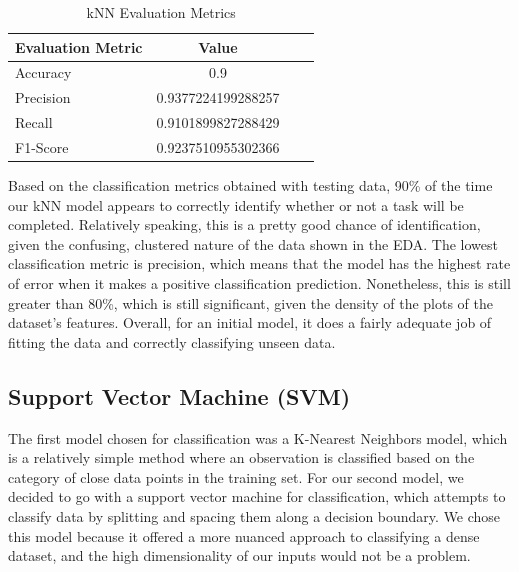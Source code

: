 \documentclass[11pt]{article}
\begin{document}
\begin{table}[hbt!]
   \large
   \centering
   \begin{tabular}{lccr}
   \hline
   \textbf{Evaluation Metric} & \textbf{Value} \\ 
   \hline
   Accuracy & 0.9  \\
   Precision & 0.9377224199288257  \\
   Recall & 0.9101899827288429  \\
   F1-Score & 0.9237510955302366 \\   
   \end{tabular}
   \caption{kNN Evaluation Metrics} 
\end{table}

Based on the classification metrics obtained with testing data, 90\% of the time our kNN model appears to correctly identify whether or not a task will be completed. Relatively speaking, this is a pretty good chance of identification, given the confusing, clustered nature of the data shown in the EDA. The lowest classification metric is precision, which means that the model has the highest rate of error when it makes a positive classification prediction. Nonetheless, this is still greater than 80\%, which is still significant, given the density of the plots of the dataset's features. Overall, for an initial model, it does a fairly adequate job of fitting the data and correctly classifying unseen data.

\subsection{Support Vector Machine (SVM)}
The first model chosen for classification was a K-Nearest Neighbors model, which is a relatively simple method where an observation is classified based on the category of close data points in the training set. For our second model, we decided to go with a support vector machine for classification, which attempts to classify data by splitting and spacing them along a decision boundary. We chose this model because it offered a more nuanced approach to classifying a dense dataset, and the high dimensionality of our inputs would not be a problem.

\end{document}
